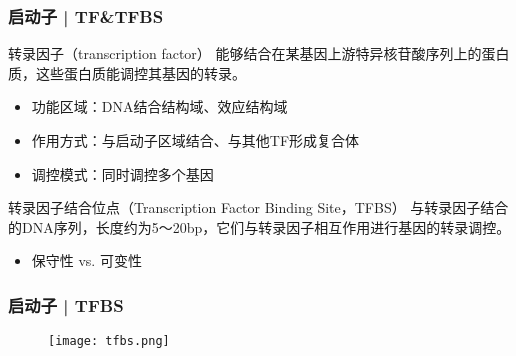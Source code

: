 \begin{frame}
  \frametitle{启动子 | TF\&TFBS}
  \begin{block}{转录因子（transcription factor）}
    能够结合在某基因上游特异核苷酸序列上的蛋白质，这些蛋白质能调控其基因的转录。
    \begin{itemize}
      \item 功能区域：DNA结合结构域、效应结构域
      \item 作用方式：与启动子区域结合、与其他TF形成复合体
      \item 调控模式：同时调控多个基因
    \end{itemize}
  \end{block}
  \pause
  \begin{block}{转录因子结合位点（Transcription Factor Binding Site，TFBS）}
    与转录因子结合的DNA序列，长度约为5～20bp，它们与转录因子相互作用进行基因的转录调控。
    \begin{itemize}
      \item 保守性 vs. 可变性
    \end{itemize}
  \end{block}
\end{frame}

\begin{frame}
  \frametitle{启动子 | TFBS}
  \begin{figure}
    \centering
    \texttt{[image: tfbs.png]}
  \end{figure}
\end{frame}

